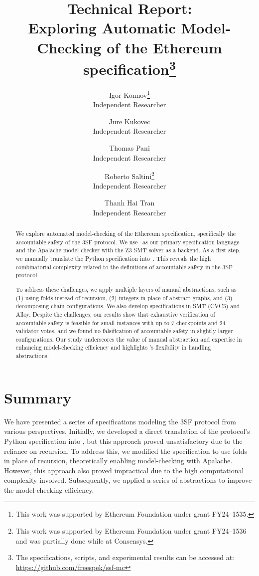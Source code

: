 \documentclass[12pt]{article}
\title{Technical Report:\\
    Exploring Automatic Model-Checking of the Ethereum specification\footnote{%
        The specifications, scripts, and experimental results can be accessed at:\\
        \url{https://github.com/freespek/ssf-mc}
    }}
\author{%
    Igor Konnov\thanks{This work was supported by Ethereum Foundation
    under grant FY24--1535.}\\ \small Independent Researcher \\
    \and
    Jure Kukovec\footnotemark[2] \\ \small Independent Researcher \\
    \and
    Thomas Pani\footnotemark[2] \\ \small Independent Researcher \\
    \and
    Roberto Saltini\thanks{This work was supported by Ethereum Foundation
    under grant FY24--1536 and was partially done while at Consensys.} \\ \small Independent Researcher \\
    \and
    Thanh Hai Tran\footnotemark[3] \\ \small Independent Researcher
}
\date{}
\begin{document}
\maketitle

\begin{abstract}

We explore automated model-checking of the Ethereum specification, specifically
the accountable safety of the 3SF protocol. We use~\tlap{} as our primary
specification language and the Apalache model checker with the Z3 SMT solver as
a backend. As a first step, we manually translate the Python specification
into~\tlap{}. This reveals the high combinatorial complexity related to the
definitions of accountable safety in the 3SF protocol.

To address these challenges, we apply multiple layers of manual abstractions,
such as (1) using folds instead of recursion, (2) integers in place of abstract
graphs, and (3) decomposing chain configurations. We also develop
specifications in SMT (CVC5) and Alloy. Despite the challenges, our results show that
exhaustive verification of accountable safety is feasible for small
instances with up to 7 checkpoints and 24 validator votes, and we found no
falsification of accountable safety in slightly larger configurations. Our
study underscores the value of manual abstraction and expertise in enhancing
model-checking efficiency and highlights \tlap{}'s flexibility in handling
abstractions.

\end{abstract}

\setcounter{tocdepth}{2}  %
\tableofcontents














\section{Summary}\label{sec:summary}
We have presented a series of specifications modeling the 3SF protocol from
various perspectives. Initially, we developed a direct translation of the
protocol's Python specification into \tlap{}, but this approach proved
unsatisfactory due to the reliance on recursion. To address this, we modified
the specification to use folds in place of recursion, theoretically enabling
model-checking with Apalache. However, this approach also proved impractical
due to the high computational complexity involved. Subsequently, we applied a
series of abstractions to improve the model-checking efficiency.
\end{document}
